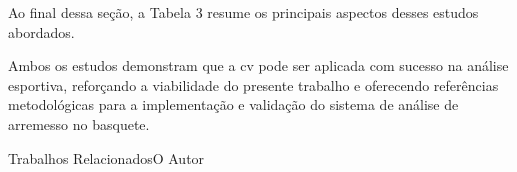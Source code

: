 Ao final dessa seção, a Tabela 3 resume os principais aspectos desses estudos abordados.

Ambos os estudos demonstram que a \ac{cv} pode ser aplicada com sucesso na análise esportiva, 
reforçando a viabilidade do presente trabalho e oferecendo referências metodológicas para a implementação e validação do sistema de análise de arremesso no basquete.


    \begin{tabela}{Trabalhos Relacionados}{O Autor}
        \label{tab:trabalhos-relacionados}
\end{tabela}
